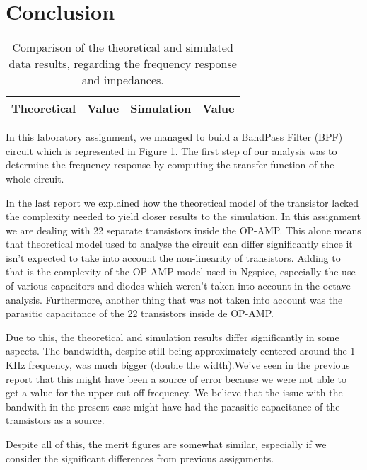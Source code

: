 \section{Conclusion}
\label{sec:conclusion}
\par
\begin{table}[!h]
  \centering
  \begin{tabular}{c c c c}
    \hline    
    {\bf Theoretical} & {\bf Value} & {\bf Simulation} & {\bf Value}\\ \hline
     
  \end{tabular}
  \caption{Comparison of the theoretical and simulated data results, regarding the frequency response and impedances.}
  \label{tab:comp}
\end{table}

In this laboratory assignment, we managed to build a BandPass Filter (BPF) circuit which is represented in Figure 1. The first step of our analysis was to determine the frequency response by computing the transfer function of the whole circuit.

In the last report we explained how the theoretical model of the transistor lacked the complexity needed to yield closer results to the simulation. In this assignment we are dealing with 22 separate transistors inside the OP-AMP. This alone means that theoretical model used to analyse the circuit can differ significantly since it isn't expected to take into account the non-linearity of transistors. Adding to that is the complexity of the OP-AMP model used in Ngspice, especially the use of various capacitors and diodes which weren't taken into account in the octave analysis. Furthermore, another thing that was not taken into account was the parasitic capacitance of the 22 transistors inside de OP-AMP. 

Due to this, the theoretical and simulation results differ significantly in some aspects. 
The bandwidth, despite still being approximately centered around the 1 KHz frequency, was much bigger (double the width).We've seen in the previous report that this might have been a source of error because we were not able to get a value for the upper cut off frequency. We believe that the issue with the bandwith in the present case might have had the parasitic capacitance of the transistors as a source.


Despite all of this, the merit figures are somewhat similar, especially if we consider the significant differences from previous assignments.








